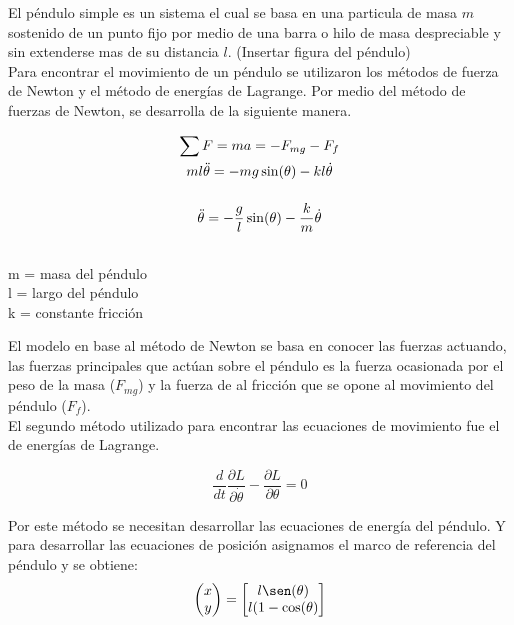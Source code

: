 
El péndulo simple es un sistema el cual se basa en una particula de masa $m$ sostenido de un punto fijo por medio de una barra o hilo de masa despreciable y sin extenderse mas de su distancia $l$. (Insertar figura del péndulo)\\

Para encontrar el movimiento de un péndulo se utilizaron los métodos de fuerza de Newton y el método de energías de Lagrange. Por medio del método de fuerzas de Newton, se desarrolla de la siguiente manera.
\begin{large}
\begin{gather*}
\sum F = ma = -F_{mg} - F_f \\ \bigskip
ml\ddot{\theta} = -mg\sin(\theta) - kl\dot{\theta} \\ \bigskip
\ddot{\theta} = -\dfrac{g}{l}\sin(\theta) - \dfrac{k}{m}\dot{\theta} \\
\end{gather*} 
\end{large}
\begin{flushright}
\begin{small}
m = masa del péndulo\\
l = largo del péndulo\\
k = constante fricción\\
\end{small}
\end{flushright}

El modelo en base al método de Newton se basa en conocer las fuerzas actuando, las fuerzas principales que actúan sobre el péndulo es la fuerza ocasionada por el peso de la masa ($F_{mg}$) y la fuerza de al fricción que se opone al movimiento del péndulo ($F_f$).\\

El segundo método utilizado para encontrar las ecuaciones de movimiento fue el de energías de Lagrange.
\begin{large}
\begin{equation} \label{L_equ}
\dfrac{d}{dt} \dfrac{\partial L}{\partial \dot{\theta}} - \dfrac{\partial L}{\partial\theta} = 0
\end{equation}
\end{large}
Por este método se necesitan desarrollar las ecuaciones de energía del péndulo. Y para desarrollar las ecuaciones de posición asignamos el marco de referencia del péndulo y se obtiene:\\
\begin{equation}
\left(\begin{matrix}
x\\
y
\end{matrix}\right) = 
\begin{bmatrix}
l\sen(\theta)\\
l(1 - \cos(\theta)
\end{bmatrix}
\end{equation}

